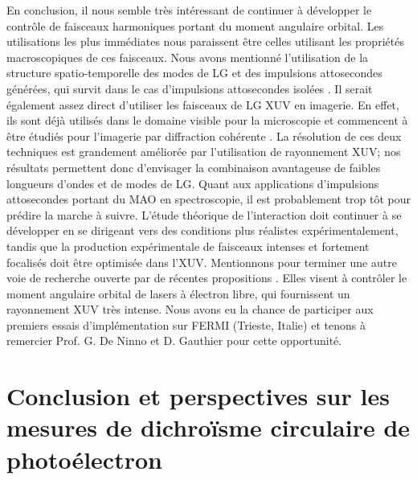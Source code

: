 En conclusion, il nous semble très intéressant de continuer à développer le contrôle de faisceaux harmoniques portant du moment angulaire orbital. Les utilisations les plus immédiates nous paraissent être celles utilisant les propriétés macroscopiques de ces faisceaux. Nous avons mentionné l'utilisation de la structure spatio-temporelle des modes de LG et des impulsions attosecondes générées, qui survit dans le cas d'impulsions attosecondes isolées . Il serait également assez direct d'utiliser les faisceaux de LG XUV en imagerie. En effet, ils sont déjà utilisés dans le domaine visible pour la microscopie  et commencent à être étudiés pour l'imagerie par diffraction cohérente . La résolution de ces deux techniques est grandement améliorée par l'utilisation de rayonnement XUV; nos résultats permettent donc d'envisager la combinaison avantageuse de faibles longueurs d'ondes et de modes de LG. \linebreak
Quant aux applications d'impulsions attosecondes portant du MAO en spectroscopie, il est probablement trop tôt pour prédire la marche à suivre. L'étude théorique de l'interaction doit continuer à se développer en se dirigeant vers des conditions plus réalistes expérimentalement, tandis que la production expérimentale de faisceaux intenses et fortement focalisés doit être optimisée dans l'XUV. Mentionnons pour terminer une autre voie de recherche ouverte par de récentes propositions . Elles visent à contrôler le moment angulaire orbital de lasers à électron libre, qui fournissent un rayonnement XUV très intense. Nous avons eu la chance de participer aux premiers essais d'implémentation sur FERMI (Trieste, Italie) et tenons à remercier Prof. G. De Ninno et D. Gauthier pour cette opportunité.

\section{Conclusion et perspectives sur les mesures de dichroïsme circulaire de photoélectron}